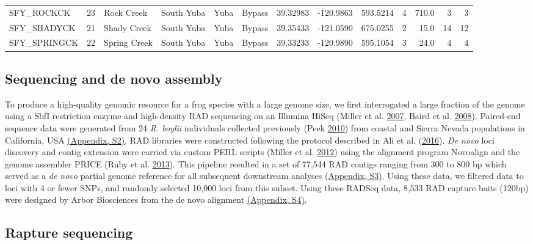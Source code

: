 \documentclass[twoside,12pt,final]{ucthesis-CA2012} %
\begin{document}
\begin{ucmainmatter}
\begin{landscape}
\begin{table}
{\begin{tabular}[t]{lrllllrrrrrrr}
SFY\_ROCKCK & 23 & Rock Creek & South Yuba & Yuba & Bypass & 39.32983 & -120.9863 & 593.5214 & 4 & 710.0 & 3 & 3\\
SFY\_SHADYCK & 21 & Shady Creek & South Yuba & Yuba & Bypass & 39.35433 & -121.0590 & 675.0255 & 2 & 15.0 & 14 & 12\\
SFY\_SPRINGCK & 22 & Spring Creek & South Yuba & Yuba & Bypass & 39.33233 & -120.9890 & 595.1054 & 3 & 24.0 & 4 & 4\\
\bottomrule
\end{tabular}}
\end{table}
\end{landscape}
\hypertarget{denovo}{%
\subsection{Sequencing and de novo assembly}\label{denovo}}

To produce a high-quality genomic resource for a frog species with a
large genome size, we first interrogated a large fraction of the genome
using a SbfI restriction enzyme and high-density RAD sequencing on an
Illumina HiSeq (Miller et al.
\protect\hyperlink{ref-miller_rapid_2007}{2007}, Baird et al.
\protect\hyperlink{ref-baird_rapid_2008}{2008}). Paired-end sequence
data were generated from 24 \emph{R. boylii} individuals collected
previously (Peek \protect\hyperlink{ref-peek_landscape_2010}{2010}) from
coastal and Sierra Nevada populations in California, USA
\protect\hyperlink{supptables}{(Appendix, S2)}. RAD libraries were
constructed following the protocol described in Ali et al.
(\protect\hyperlink{ref-ali_rad_2016}{2016}). \emph{De novo} loci
discovery and contig extension were carried via custom PERL scripts
(Miller et al. \protect\hyperlink{ref-miller_conserved_2012}{2012})
using the alignment program Novoalign and the genome assembler PRICE
(Ruby et al. \protect\hyperlink{ref-ruby_price_2013}{2013}). This
pipeline resulted in a set of 77,544 RAD contigs ranging from 300 to 800
bp which served as a \emph{de novo} partial genome reference for all
subsequent downstream analyses \protect\hyperlink{supptables}{(Appendix,
S3)}. Using these data, we filtered data to loci with 4 or fewer SNPs,
and randomly selected 10,000 loci from this subset. Using these RADSeq
data, 8,533 RAD capture baits (120bp) were designed by Arbor Biosciences
from the de novo alignment \protect\hyperlink{supptables}{(Appendix,
S4)}.

\hypertarget{rapture}{%
\subsection{Rapture sequencing}\label{rapture}}


\end{ucmainmatter}
\end{document}
